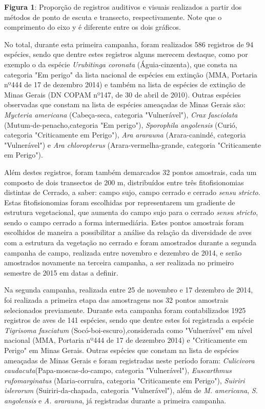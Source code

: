 \textbf{Figura 1}: Proporção de registros auditivos e visuais realizados a partir dos métodos de ponto de escuta e transecto, respectivamente. Note que o comprimento do eixo y é diferente entre os dois gráficos.

No total, durante esta primeira campanha, foram realizados 586 registros de 94 espécies, sendo que dentre estes registros alguns merecem destaque, como por exemplo o da espécie \textit{Urubitinga coronata} (Águia-cinzenta), que consta na categoria "Em perigo" da lista nacional de espécies em extinção (MMA, Portaria nº444 de 17 de dezembro 2014) e também na lista de espécies de extinção de Minas Gerais (DN COPAM nº147, de 30 de abril de 2010). Outras espécies observadas que constam na lista de espécies ameaçadas de Minas Gerais são: \textit{Mycteria americana} (Cabeça-seca, categoria "Vulnerável"), \textit{Crax fasciolata} (Mutum-de-penacho,categoria "Em perigo"), \textit{Sporophila angolensis} (Curió, categoria "Criticamente em Perigo"), \textit{Ara ararauna}  (Arara-canindé, categoria "Vulnerável") e \textit{Ara chloropterus} (Arara-vermelha-grande, categoria "Criticamente em Perigo").

Além destes registros, foram também demarcados 32 pontos amostrais, cada um composto de dois transectos de 200 m, distribuídos entre três fitofisionomias distintas de Cerrado, a saber: campo sujo, campo cerrado e cerrado \textit{sensu stricto}. Estas fitofisionomias foram escolhidas por representarem um gradiente de estrutura vegetacional, que aumenta do campo sujo para o cerrado \textit{sensu stricto}, sendo o campo cerrado a forma intermediária. Estes pontos amostrais foram escolhidos de maneira a possibilitar a análise da relação da diversidade de aves com a estrutura da vegetação no cerrado e foram amostrados durante a segunda campanha de campo, realizada entre novembro e dezembro de 2014, e serão amostrados novamente na terceira campanha, a ser realizada no primeiro semestre de 2015 em datas a definir.

Na segunda campanha, realizada entre 25 de novembro e 17 dezembro de 2014, foi realizada a primeira etapa das amostragens nos 32 pontos amostrais selecionados previamente. Durante esta campanha foram contabilizados 1925 registros de aves de 141 espécies, sendo que dentre estes foi registrada a espécie \textit{Tigrisoma fasciatum} (Socó-boi-escuro),considerada como "Vulnerável" em nível nacional (MMA, Portaria nº444 de 17 de dezembro 2014) e "Criticamente em Perigo" em Minas Gerais. Outras espécies que constam na lista de espécies ameaçadas de Minas Gerais e foram registradas neste período foram: \textit{Culicivora caudacuta}(Papa-moscas-do-campo, categoria "Vulnerável"), \textit{Euscarthmus rufomarginatus} (Maria-corruíra, categoria "Criticamente em Perigo"), \textit{Suiriri islerorum} (Suiriri-da-chapada, categoria "Vulnerável"), além de \textit{M. americana}, \textit{S. angolensis} e \textit{A. ararauna}, já registradas durante a primeira campanha.


